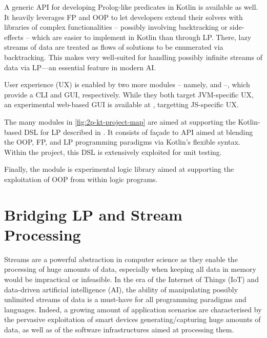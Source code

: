 \documentclass[12pt,a4paper,openright,twoside]{book}
\begin{document}
A generic API for developing Prolog-like predicates in Kotlin is available as well.
%
It heavily leverages FP and OOP to let developers extend their solvers with libraries of complex functionalities -- possibly involving backtracking or side-effects -- which are easier to implement in Kotlin than through LP.
%
There, lazy streams of data are treated as flows of solutions to be enumerated via backtracking.
%
This makes \twopkt{} very well-suited for handling possibly infinite streams of data via LP---an essential feature in modern AI.

User experience (UX) is enabled by two more modules -- namely,  and  --, which provide a CLI and GUI, respectively.
%
While they both target JVM-specific UX, an experimental web-based GUI is available at \cite{2P-Playground}, targetting JS-specific UX.

The many  modules in \cref{fig:2p-kt-project-map} are aimed at supporting the Kotlin-based DSL for LP described in \cite{kotlindsi4prolog-woa2020}.
%
It consists of façade to \twopkt{} API aimed at blending the OOP, FP, and LP programming paradigms via Kotlin's flexible syntax.
%
Within the \twopkt{} project, this DSL is extensively exploited for unit testing.

Finally, the  module is experimental logic library aimed at supporting the exploitation of OOP from within logic programs.


\chapter{Bridging LP and Stream Processing}


Streams are a powerful abstraction in computer science as they enable the processing of huge amounts of data, especially when keeping all data in memory would be impractical or infeasible.
%
In the era of the Internet of Things (IoT) and data-driven artificial intelligence (AI), the ability of manipulating possibly unlimited streams of data is a must-have for all programming paradigms and languages.
%
Indeed, a growing amount of application scenarios are characterised by the pervasive exploitation of smart devices generating/capturing huge amounts of data, as well as of the software infrastructures aimed at processing them.
\end{document}
